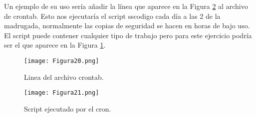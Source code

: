 Un ejemplo de su uso sería añadir la línea que aparece en la Figura \ref{fig:figura21} al archivo de crontab. Esto nos ejecutaría el script sscodigo cada
día a las 2 de la madrugada, normalmente las copias de seguridad se hacen en horas de bajo uso. El script puede contener cualquier tipo de trabajo pero para este 
ejercicio podría ser el que aparece en la Figura \ref{fig:figura20}.

\begin{figure}[H] 
\centering
\texttt{[image: Figura20.png]}  
\caption{Linea del archivo crontab.}\label{fig:figura20}
\end{figure}

\begin{figure}[H] 
\centering
\texttt{[image: Figura21.png]}  
\caption{Script ejecutado por el cron.}\label{fig:figura21}
\end{figure}


\newpage



